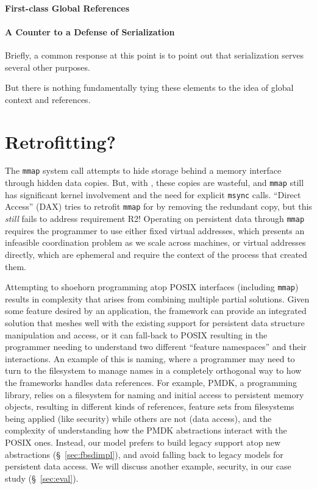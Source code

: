 \paragraph{First-class Global References}


\paragraph{A Counter to a Defense of Serialization}

Briefly, a common response at this point is to point out that serialization serves several other purposes.

But there is nothing fundamentally tying these elements to the idea of global context and references.

\section{Retrofitting?}

The \texttt{mmap} system call attempts to hide storage behind a memory interface through hidden
data copies. But, with \NVM, these copies are wasteful, and \texttt{mmap} still has significant kernel
involvement and the need for explicit \texttt{msync} calls. ``Direct Access'' (DAX)
tries to retrofit \texttt{mmap} for \NVM by removing the redundant copy, but this \emph{still}
fails to address requirement R2! Operating on persistent data through \texttt{mmap} requires the programmer to
use either fixed virtual addresses, which presents an infeasible coordination problem
as we scale across machines, or virtual addresses directly, which are ephemeral and require the
context of the process that created them.

Attempting to shoehorn \NVM programming atop POSIX interfaces (including \texttt{mmap}) results in
complexity that arises from combining multiple partial solutions. Given some feature desired by an
application, the \NVM framework can provide an integrated solution that meshes
well with the existing support for persistent data structure manipulation and access, or it can
fall-back to POSIX resulting in the programmer needing to understand two different ``feature
namespaces'' and their interactions. An example of this is naming, where a programmer may need
to turn to the filesystem to manage names in a completely orthogonal way to how the \NVM frameworks handles
data references. For example, PMDK, a \NVM programming library, relies on a filesystem for naming and initial access to
persistent memory objects, resulting in different kinds of references, feature sets from filesystems
being applied (like security) while others are not (data access), and the complexity of
understanding how the PMDK abstractions interact with the POSIX ones. Instead, our model prefers to
build legacy support atop new abstractions (\S~\ref{sec:fbsdimpl}), and avoid falling back to legacy
models for persistent data access. We will discuss another example,
security, in our case study (\S~\ref{sec:eval}).

